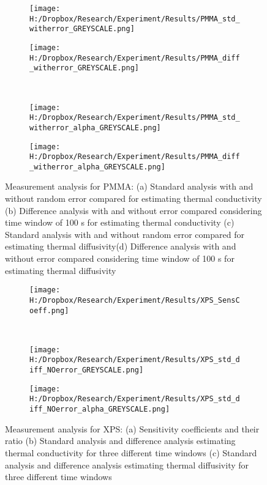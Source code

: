 \documentclass[12pt]{report}
\begin{document}
\begin{figure}
\begin{subfigure}{.5\textwidth}
\centering
\texttt{[image: H:/Dropbox/Research/Experiment/Results/PMMA\_std\_witherror\_GREYSCALE.png]}
\caption{}
\end{subfigure}\hfill
\begin{subfigure}{.5\textwidth}
\centering
\texttt{[image: H:/Dropbox/Research/Experiment/Results/PMMA\_diff\_witherror\_GREYSCALE.png]}
\caption{}
\end{subfigure}\\
\begin{subfigure}{.5\textwidth}
\centering
\texttt{[image: H:/Dropbox/Research/Experiment/Results/PMMA\_std\_witherror\_alpha\_GREYSCALE.png]}
\caption{}
\end{subfigure}\hfill
\begin{subfigure}{.5\textwidth}
\centering
\texttt{[image: H:/Dropbox/Research/Experiment/Results/PMMA\_diff\_witherror\_alpha\_GREYSCALE.png]}
\caption{}
\end{subfigure}
\caption{Measurement analysis for PMMA: (a) Standard analysis with and without random error compared for estimating thermal conductivity (b) Difference analysis with and without error compared considering time window of 100 s for estimating thermal conductivity (c) Standard analysis with and without random error compared for estimating thermal diffusivity(d) Difference analysis with and without error compared considering time window of 100 s for estimating thermal diffusivity}
\label{pic:pmma2}
\end{figure}


\begin{figure}
\begin{subfigure}{1\textwidth}
\centering
\texttt{[image: H:/Dropbox/Research/Experiment/Results/XPS\_SensCoeff.png]}
\caption{}
\end{subfigure}\\
\begin{subfigure}{.5\textwidth}
\centering
\texttt{[image: H:/Dropbox/Research/Experiment/Results/XPS\_std\_diff\_NOerror\_GREYSCALE.png]}
\caption{}
\end{subfigure}\hfill
\begin{subfigure}{.5\textwidth}
\centering
\texttt{[image: H:/Dropbox/Research/Experiment/Results/XPS\_std\_diff\_NOerror\_alpha\_GREYSCALE.png]}
\caption{}
\end{subfigure}
\caption{Measurement analysis for XPS: (a) Sensitivity coefficients and their ratio (b) Standard analysis and difference analysis estimating thermal conductivity for three different time windows (c) Standard analysis and difference analysis estimating thermal diffusivity for three different time windows}
\label{pic:xps1}
\end{figure}
\end{document}
